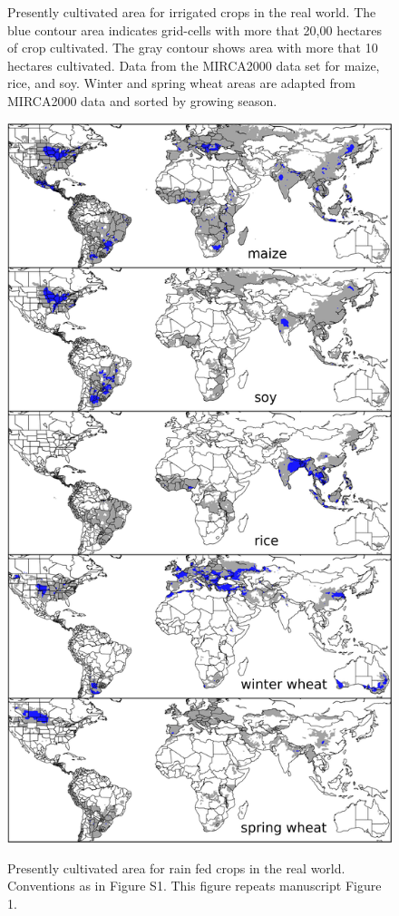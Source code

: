 \documentclass[10pt]{article}
\begin{document}
\begin{figure}[h!]
\begin{minipage}{.45\textwidth}
    \caption{Presently cultivated area for irrigated crops in the real world. The blue contour area indicates grid-cells with more that 20,00 hectares of crop cultivated. The gray contour shows area with more that 10 hectares cultivated. Data from the MIRCA2000 data set for maize, rice, and soy. Winter and spring wheat areas are adapted from MIRCA2000 data and sorted by growing season.}
    \label{fig:irrarea}
\end{minipage}
\hspace{.05\linewidth}
\begin{minipage}{.45\textwidth}
    \centering
    \vspace{-19mm}
    \includegraphics[width=\textwidth]{s_croparea.png}\\
    \caption{Presently cultivated area for rain fed crops in the real world. Conventions as in Figure S1. This figure repeats manuscript Figure 1.}
    \label{fig:rainfed}
\end{minipage}
\end{figure}
\end{document}
